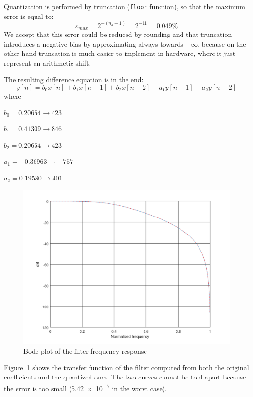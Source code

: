 \documentclass[a4paper]{article}
\begin{document}
Quantization is performed by truncation (\texttt{floor} function), so that the maximum error is equal to:
\begin{equation}\label{eq:emax}
    \varepsilon_{max} = 2^{-(n_b-1)} = 2^{-11} = 0.049\%
\end{equation}
We accept that this error could be reduced by rounding and that truncation introduces a negative bias by approximating always towards \(-\infty\), because on the other hand truncation is much easier to implement in hardware, where it just represent an arithmetic shift.

The resulting difference equation is in the end:
\begin{equation}\label{eq:diff}
    y[n] = b_0x[n] + b_1x[n-1] + b_2x[n-2] - a_1y[n-1] - a_2y[n-2]
\end{equation}
where
\begin{description}
    \item \(b_0 = 0.20654 \rightarrow 423\)
    \item \(b_1 = 0.41309 \rightarrow 846\)
    \item \(b_2 = 0.20654 \rightarrow  423\)
    \item \(a_1 = -0.36963 \rightarrow  -757\)
    \item \(a_2 = 0.19580 \rightarrow  401\)
\end{description}

\begin{figure}[hbtp]
    \centering
    \includegraphics[width=.75\linewidth]{media/tf.pdf}
    \caption{Bode plot of the filter frequency response}
    \label{fig:tf}
\end{figure}
Figure~\ref{fig:tf} shows the transfer function of the filter computed from both the original coefficients and the quantized ones. The two curves cannot be told apart because the error is too small (\num{5.42e-7} in the worst case).
\end{document}

